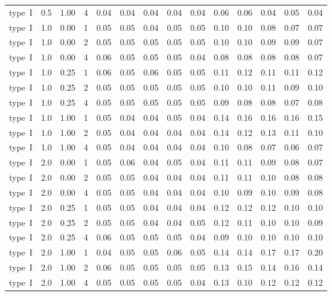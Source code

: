 \begin{table}[H]
\begin{tabular}{lrrrrrrrrrrrrr}
type~I & 0.5 & 1.00 & 4 & 0.04 & 0.04 & 0.04 & 0.04 & 0.04 & 0.06 & 0.06 & 0.04 & 0.05 & 0.04\\
type~I & 1.0 & 0.00 & 1 & 0.05 & 0.05 & 0.04 & 0.05 & 0.05 & 0.10 & 0.10 & 0.08 & 0.07 & 0.07\\
type~I & 1.0 & 0.00 & 2 & 0.05 & 0.05 & 0.05 & 0.05 & 0.05 & 0.10 & 0.10 & 0.09 & 0.09 & 0.07\\
type~I & 1.0 & 0.00 & 4 & 0.06 & 0.05 & 0.05 & 0.05 & 0.04 & 0.08 & 0.08 & 0.08 & 0.08 & 0.07\\
type~I & 1.0 & 0.25 & 1 & 0.06 & 0.05 & 0.06 & 0.05 & 0.05 & 0.11 & 0.12 & 0.11 & 0.11 & 0.12\\
type~I & 1.0 & 0.25 & 2 & 0.05 & 0.05 & 0.05 & 0.05 & 0.05 & 0.10 & 0.10 & 0.11 & 0.09 & 0.10\\
type~I & 1.0 & 0.25 & 4 & 0.05 & 0.05 & 0.05 & 0.05 & 0.05 & 0.09 & 0.08 & 0.08 & 0.07 & 0.08\\
type~I & 1.0 & 1.00 & 1 & 0.05 & 0.04 & 0.04 & 0.05 & 0.04 & 0.14 & 0.16 & 0.16 & 0.16 & 0.15\\
type~I & 1.0 & 1.00 & 2 & 0.05 & 0.04 & 0.04 & 0.04 & 0.04 & 0.14 & 0.12 & 0.13 & 0.11 & 0.10\\
type~I & 1.0 & 1.00 & 4 & 0.05 & 0.04 & 0.04 & 0.04 & 0.04 & 0.10 & 0.08 & 0.07 & 0.06 & 0.07\\
type~I & 2.0 & 0.00 & 1 & 0.05 & 0.06 & 0.04 & 0.05 & 0.04 & 0.11 & 0.11 & 0.09 & 0.08 & 0.07\\
type~I & 2.0 & 0.00 & 2 & 0.05 & 0.05 & 0.04 & 0.04 & 0.04 & 0.11 & 0.11 & 0.10 & 0.08 & 0.08\\
type~I & 2.0 & 0.00 & 4 & 0.05 & 0.05 & 0.04 & 0.04 & 0.04 & 0.10 & 0.09 & 0.10 & 0.09 & 0.08\\
type~I & 2.0 & 0.25 & 1 & 0.05 & 0.05 & 0.04 & 0.04 & 0.04 & 0.12 & 0.12 & 0.12 & 0.10 & 0.10\\
type~I & 2.0 & 0.25 & 2 & 0.05 & 0.05 & 0.04 & 0.04 & 0.05 & 0.12 & 0.11 & 0.10 & 0.10 & 0.09\\
type~I & 2.0 & 0.25 & 4 & 0.06 & 0.05 & 0.05 & 0.05 & 0.04 & 0.09 & 0.10 & 0.10 & 0.10 & 0.10\\
type~I & 2.0 & 1.00 & 1 & 0.04 & 0.05 & 0.05 & 0.06 & 0.05 & 0.14 & 0.14 & 0.17 & 0.17 & 0.20\\
type~I & 2.0 & 1.00 & 2 & 0.06 & 0.05 & 0.05 & 0.05 & 0.05 & 0.13 & 0.15 & 0.14 & 0.16 & 0.14\\
type~I & 2.0 & 1.00 & 4 & 0.05 & 0.05 & 0.05 & 0.05 & 0.04 & 0.13 & 0.10 & 0.12 & 0.12 & 0.12\\
\bottomrule
\end{tabular}
\endgroup{}
\end{table}